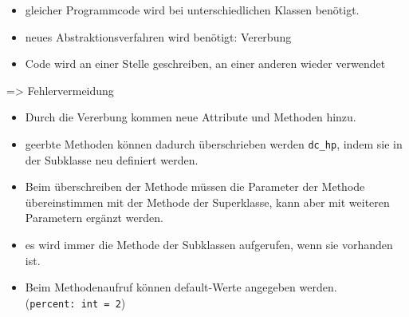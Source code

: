 \documentclass[
  11pt,
  a4paper,
  DIV=11,
  numbers=noendperiod]{scrartcl}
\providecommand{\tightlist}{%
  \setlength{\itemsep}{0pt}\setlength{\parskip}{0pt}}\usepackage{longtable,booktabs,array}
\begin{document}
\begin{tcolorbox}[enhanced jigsaw, left=2mm, colframe=quarto-callout-warning-color-frame, opacitybacktitle=0.6, arc=.35mm, toptitle=1mm, colbacktitle=quarto-callout-warning-color!10!white, rightrule=.15mm, colback=white, breakable, toprule=.15mm, bottomtitle=1mm, leftrule=.75mm, titlerule=0mm, bottomrule=.15mm, title=\textcolor{quarto-callout-warning-color}{\faExclamationTriangle}\hspace{0.5em}{Beobachtung}, opacityback=0, coltitle=black]

\begin{itemize}
\tightlist
\item
  gleicher Programmcode wird bei unterschiedlichen Klassen benötigt.
\item
  neues Abstraktionsverfahren wird benötigt: Vererbung
\item
  Code wird an einer Stelle geschreiben, an einer anderen wieder
  verwendet
\end{itemize}

=\textgreater{} Fehlervermeidung

\end{tcolorbox}

\begin{itemize}
\tightlist
\item
  Durch die Vererbung kommen neue Attribute und Methoden hinzu.
\item
  geerbte Methoden können dadurch überschrieben werden \texttt{dc\_hp},
  indem sie in der Subklasse neu definiert werden.
\item
  Beim überschreiben der Methode müssen die Parameter der Methode
  übereinstimmen mit der Methode der Superklasse, kann aber mit weiteren
  Parametern ergänzt werden.
\item
  es wird immer die Methode der Subklassen aufgerufen, wenn sie
  vorhanden ist.
\item
  Beim Methodenaufruf können default-Werte angegeben werden.
  (\texttt{percent:\ int\ =\ 2})
\end{itemize}
\end{document}
